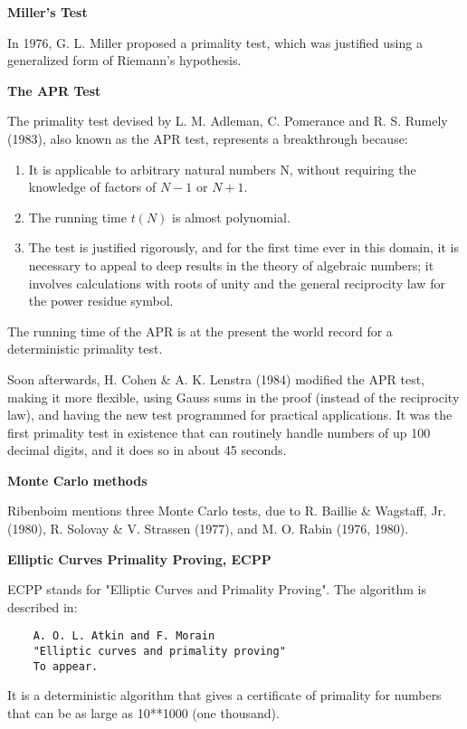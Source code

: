{\bf Miller's Test}

In 1976, G. L. Miller proposed a primality test, which was justified
using a generalized form of Riemann's hypothesis.


{\bf The APR Test}

The primality test devised by L. M. Adleman, C. Pomerance and R. S.
Rumely (1983), also known as the APR test, represents a breakthrough
because:

\begin{enumerate}
\item It is applicable to arbitrary natural numbers N, without requiring
the knowledge of factors of $N - 1$ or $N + 1$.
\item The running time $t(N)$ is almost polynomial.
\item The test is justified rigorously, and for the first time ever in
this domain, it is necessary to appeal to deep results in the theory of
algebraic numbers; it involves calculations with roots of unity and the
general reciprocity law for the power residue symbol.
\end{enumerate}

The running time of the APR is at the present the world record for a
deterministic primality test.

Soon afterwards, H. Cohen \& A. K. Lenstra (1984) modified the APR test,
making it more flexible, using Gauss sums in the proof (instead of the
reciprocity law), and having the new test programmed for practical
applications. It was the first primality test in existence that can
routinely handle numbers of up 100 decimal digits, and it does so in
about 45 seconds.


{\bf Monte Carlo methods}

Ribenboim mentions three Monte Carlo tests, due to R. Baillie \&
Wagstaff, Jr. (1980), R. Solovay \& V. Strassen (1977), and M. O. Rabin
(1976, 1980).


{\bf Elliptic Curves Primality Proving, ECPP}

ECPP stands for "Elliptic Curves and Primality Proving". The algorithm
is described in:

\begin{verbatim}
    A. O. L. Atkin and F. Morain
    "Elliptic curves and primality proving"
    To appear.
\end{verbatim}

It is a deterministic algorithm that gives a certificate of primality
for numbers that can be as large as 10**1000 (one thousand).

